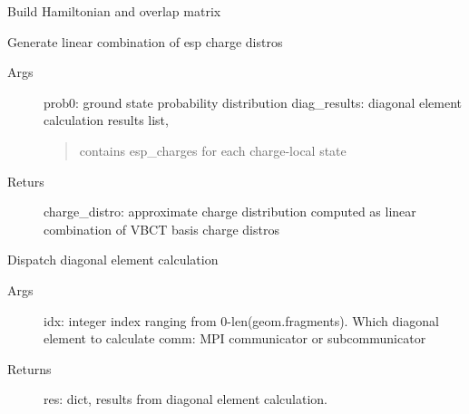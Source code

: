 \documentclass[letterpaper,10pt,english]{sphinxmanual}
\begin{document}
\begin{fulllineitems}
\label{\detokenize{vbct:vbct.energy.build_secular_equations}}
Build Hamiltonian and overlap matrix

\end{fulllineitems}


\begin{fulllineitems}
\label{\detokenize{vbct:vbct.energy.calc_chg_distro}}
Generate linear combination of esp charge distros
\begin{description}
\item[{Args}] \leavevmode
prob0: ground state probability distribution
diag\_results: diagonal element calculation results list,
\begin{quote}

contains esp\_charges for each charge-local state
\end{quote}

\item[{Returs}] \leavevmode
charge\_distro: approximate charge distribution computed as linear
combination of VBCT basis charge distros

\end{description}

\end{fulllineitems}


\begin{fulllineitems}
\label{\detokenize{vbct:vbct.energy.calc_diagonal}}
Dispatch diagonal element calculation
\begin{description}
\item[{Args}] \leavevmode
idx: integer index ranging from 0-len(geom.fragments). Which
diagonal element to calculate
comm: MPI communicator or subcommunicator

\item[{Returns}] \leavevmode
res: dict, results from diagonal element calculation.

\end{description}

\end{fulllineitems}
\end{document}
